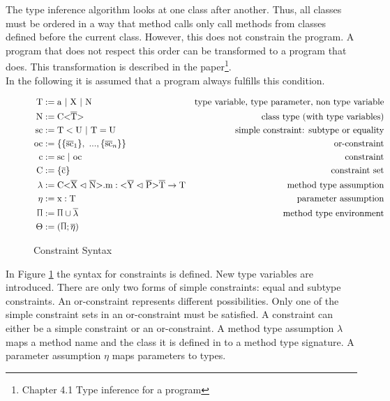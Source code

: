 The type inference algorithm looks at one class after another. Thus, all classes must be ordered in a way that method calls only call methods from classes defined before the current class.
However, this does not constrain the program. A program that does not respect this order can be transformed to a program that does.
This transformation is described in the paper\footnote{Chapter 4.1 Type inference for a program}.
\\
In the following it is assumed that a program always fulfills this condition.

\begin{figure}
    \begin{align*}
        \text{T} &:= \text{a} \ | \ \text{X} \ | \ \text{N} &\text{type variable, type parameter, non type variable} \\
        \text{N} &:= \text{C} \vv{\ot{T}} &\text{class type (with type variables)}\\
        \text{sc} &:= \text{T} < \text{U} \ | \ \text{T} = \text{U} &\text{simple constraint: subtype or equality}\\
        \text{oc} &:= \{ \{ \ot{sc}_1 \}, \ ..., \{ \ot{sc}_n \} \} &\text{or-constraint}\\
        \text{c} &:= \text{sc} \ | \ \text{oc} &\text{constraint}\\
        \text{C} &:= \{ \ot{c} \} &\text{constraint set}\\
        \lambda &:= \cm : \yp \oto{\text{T}} &\text{method type assumption}\\
        \eta &:= \text{x} : \text{T} &\text{parameter assumption}\\
        \sprod{0.7} &:= \sprod{0.7} \cup \overline{\lambda} &\text{method type environment}\\
        \Theta &:= ( \sprod{0.7}; \overline{\eta} )
    \end{align*}
    \caption{Constraint Syntax}
    \label{constraint_syntax}
\end{figure}

In Figure \ref{constraint_syntax} the syntax for constraints is defined. New type variables  are introduced. There are only two forms of simple constraints: equal and subtype constraints. An or-constraint represents different possibilities. Only one of the simple constraint sets in an or-constraint must be satisfied.
A constraint can either be a simple constraint or an or-constraint. A method type assumption $\lambda$ maps a method name and the class it is defined in to a method type signature. A parameter assumption $\eta$ maps parameters to types.

